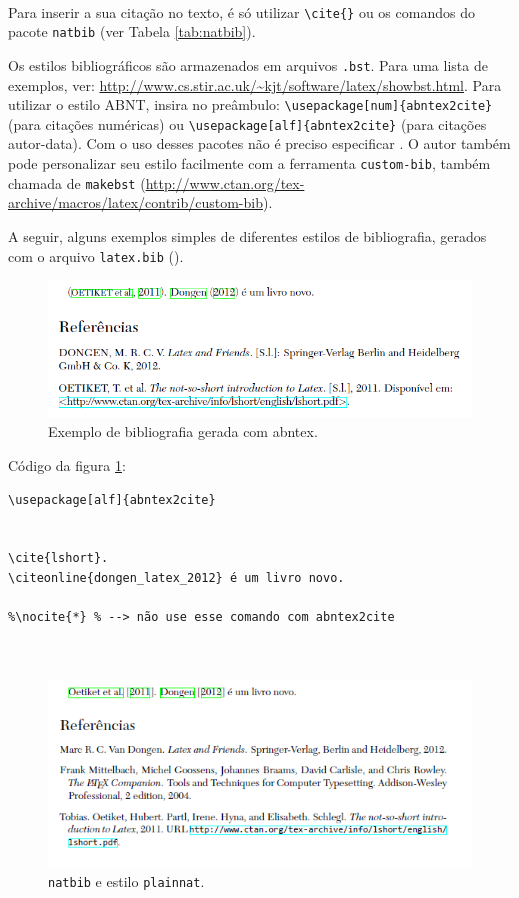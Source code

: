 \begin{verbatim}


\end{verbatim}

Para inserir a sua citação no texto, é só utilizar \verb+\cite{}+ ou os comandos do pacote \texttt{natbib} (ver Tabela \ref{tab:natbib}).

Os estilos bibliográficos são armazenados em arquivos \texttt{.bst}. Para uma lista de exemplos, ver: \url{http://www.cs.stir.ac.uk/~kjt/software/latex/showbst.html}. Para utilizar o estilo ABNT, insira no preâmbulo: 
\verb+\usepackage[num]{abntex2cite}+ (para citações numéricas) ou \verb+\usepackage[alf]{abntex2cite}+ (para citações autor-data). Com o uso desses pacotes não é preciso especificar \verb++.
O autor também pode personalizar seu estilo facilmente com a ferramenta \texttt{custom-bib}, também chamada de \texttt{makebst} (\url{http://www.ctan.org/tex-archive/macros/latex/contrib/custom-bib}).


A seguir, alguns exemplos simples de diferentes estilos de bibliografia, gerados com o arquivo \texttt{latex.bib} (\pageref*{latex-bib}).



\begin{figure}
\centering
\includegraphics[width=0.7\linewidth]{./abntex-bibliografia-figura}
\caption{Exemplo de bibliografia gerada com abntex.}
\label{fig:abntex-bibliografia-figura}
\end{figure}

Código da figura \ref{fig:abntex-bibliografia-figura}:

\begin{verbatim}
\usepackage[alf]{abntex2cite}


\cite{lshort}.
\citeonline{dongen_latex_2012} é um livro novo.

%\nocite{*} % --> não use esse comando com abntex2cite



\end{verbatim}


\begin{figure}
\centering
\includegraphics[width=0.7\linewidth]{./natbib-test-plainnat}
\caption{\texttt{natbib} e estilo \texttt{plainnat}.}
\label{fig:natbib-test-plainnat}
\end{figure}

